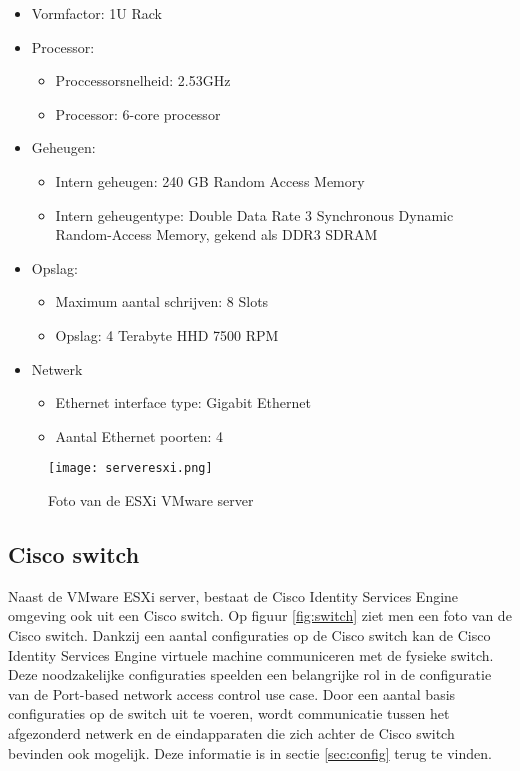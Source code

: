 \begin{itemize}
	\item Vormfactor: 1U Rack
	\item Processor:
	\begin{itemize}
		\item Proccessorsnelheid: 2.53GHz
		\item Processor: 6-core processor
	\end{itemize}
	\item Geheugen:
	\begin{itemize}
		\item Intern geheugen: 240 GB Random Access Memory
		\item Intern geheugentype: Double Data Rate 3 Synchronous Dynamic Random-Access Memory, gekend als DDR3 SDRAM
	\end{itemize}
	\item Opslag:
	\begin{itemize}
		\item Maximum aantal schrijven: 8 Slots
		\item Opslag: 4 Terabyte HHD 7500 RPM
	\end{itemize}
	\item Netwerk
	\begin{itemize}
		\item Ethernet interface type: Gigabit Ethernet
		\item Aantal Ethernet poorten: 4 
	\end{itemize}
\end{itemize}

\begin{figure}[H]
	\centering
	\texttt{[image: serveresxi.png]}
	\caption{Foto van de ESXi VMware server}
	\label{fig:VmwareSer}
\end{figure}
\newpage
\subsection{Cisco switch}
Naast de VMware ESXi server, bestaat de Cisco Identity Services Engine omgeving ook uit een Cisco switch. Op figuur \ref{fig:switch} ziet men een foto van de Cisco switch. Dankzij een aantal configuraties op de Cisco switch kan de Cisco Identity Services Engine virtuele machine communiceren met de fysieke switch. Deze noodzakelijke configuraties speelden een belangrijke rol in de configuratie van de Port-based network access control use case. 
\newline
\newline
Door een aantal basis configuraties op de switch uit te voeren, wordt communicatie tussen het afgezonderd netwerk en de eindapparaten die zich achter de Cisco switch bevinden ook mogelijk. Deze informatie is in sectie \ref{sec:config} terug te vinden.



